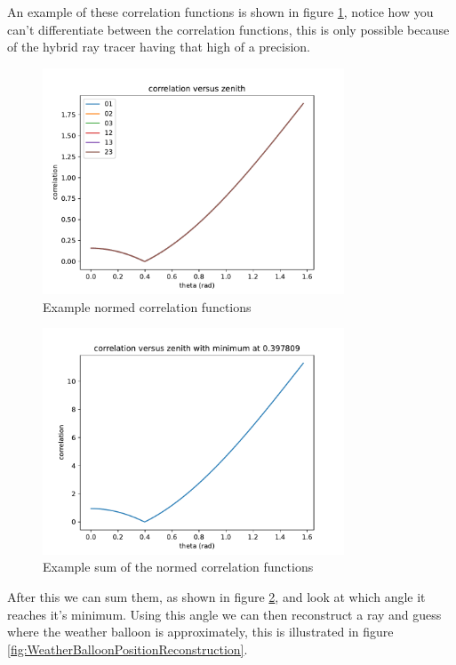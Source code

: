 \documentclass[11pt,a4paper,faculty=we,language=en,doctype=report]{cls/ugent-doc}
\begin{document}
An example of these correlation functions is shown in figure \ref{fig:NormedCorrelation}, 
notice how you can't differentiate between the correlation functions, this is only possible
because of the hybrid ray tracer having that high of a precision.
\begin{figure}
	\centering
	\includegraphics[width=0.8\textwidth]{NormedCorrelation.pdf}
	\caption{Example normed correlation functions}
	\label{fig:NormedCorrelation}
\end{figure}
\begin{figure}
	\centering
	\includegraphics[width=0.8\textwidth]{SummedCorrelation.pdf}
	\caption{Example sum of the normed correlation functions}
	\label{fig:SummedCorrelation}
\end{figure}
After this we can sum them, as shown in figure \ref{fig:SummedCorrelation}, and look
at which angle it reaches it's minimum. Using this angle we can then reconstruct a ray and guess 
where the weather balloon is approximately, this is illustrated in figure 
\ref{fig:WeatherBalloonPositionReconstruction}. 
\end{document}
